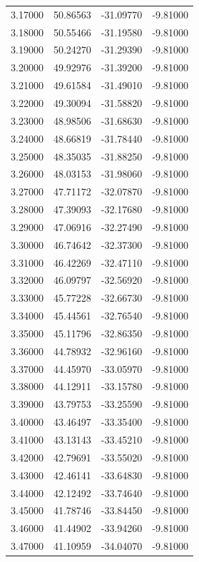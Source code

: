 \begin{table}
\begin{tabular}{llll}
3.17000 & 50.86563 & -31.09770 & -9.81000 \\
3.18000 & 50.55466 & -31.19580 & -9.81000 \\
3.19000 & 50.24270 & -31.29390 & -9.81000 \\
3.20000 & 49.92976 & -31.39200 & -9.81000 \\
3.21000 & 49.61584 & -31.49010 & -9.81000 \\
3.22000 & 49.30094 & -31.58820 & -9.81000 \\
3.23000 & 48.98506 & -31.68630 & -9.81000 \\
3.24000 & 48.66819 & -31.78440 & -9.81000 \\
3.25000 & 48.35035 & -31.88250 & -9.81000 \\
3.26000 & 48.03153 & -31.98060 & -9.81000 \\
3.27000 & 47.71172 & -32.07870 & -9.81000 \\
3.28000 & 47.39093 & -32.17680 & -9.81000 \\
3.29000 & 47.06916 & -32.27490 & -9.81000 \\
3.30000 & 46.74642 & -32.37300 & -9.81000 \\
3.31000 & 46.42269 & -32.47110 & -9.81000 \\
3.32000 & 46.09797 & -32.56920 & -9.81000 \\
3.33000 & 45.77228 & -32.66730 & -9.81000 \\
3.34000 & 45.44561 & -32.76540 & -9.81000 \\
3.35000 & 45.11796 & -32.86350 & -9.81000 \\
3.36000 & 44.78932 & -32.96160 & -9.81000 \\
3.37000 & 44.45970 & -33.05970 & -9.81000 \\
3.38000 & 44.12911 & -33.15780 & -9.81000 \\
3.39000 & 43.79753 & -33.25590 & -9.81000 \\
3.40000 & 43.46497 & -33.35400 & -9.81000 \\
3.41000 & 43.13143 & -33.45210 & -9.81000 \\
3.42000 & 42.79691 & -33.55020 & -9.81000 \\
3.43000 & 42.46141 & -33.64830 & -9.81000 \\
3.44000 & 42.12492 & -33.74640 & -9.81000 \\
3.45000 & 41.78746 & -33.84450 & -9.81000 \\
3.46000 & 41.44902 & -33.94260 & -9.81000 \\
3.47000 & 41.10959 & -34.04070 & -9.81000 \\

\end{tabular}
\end{table}
